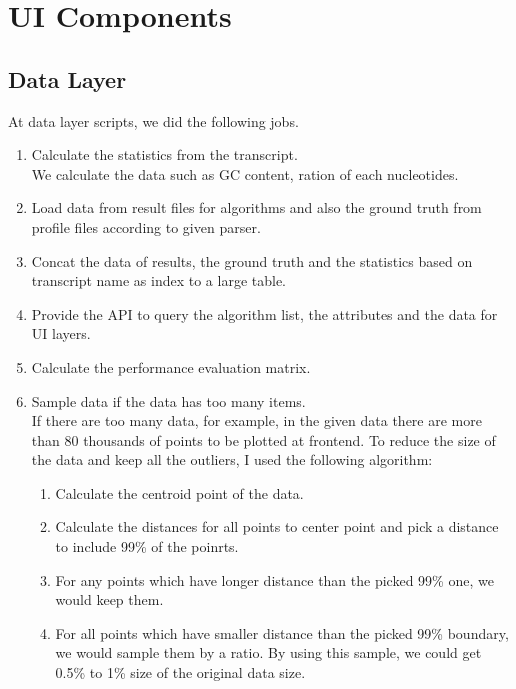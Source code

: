 \documentclass[11pt,letter]{article}
\begin{document}
\section {UI Components}

\subsection {Data Layer}
At data layer scripts, we did the following jobs.
\begin{enumerate}
\item Calculate the statistics from the transcript. \\
We calculate the data such as GC content, ration of each nucleotides.
\item Load data from result files for algorithms and also the ground truth from profile files according to given parser.
\item Concat the data of results, the ground truth and the statistics based on transcript name as index to a large table.
\item Provide the API to query the algorithm list, the attributes and the data for UI layers.
\item Calculate the performance evaluation matrix.
\item Sample data if the data has too many items. \\
If there are too many data, for example, in the given data there are more than 80 thousands of points to be plotted at frontend. To reduce the size of the data and keep all the outliers, I used the following algorithm:
\begin{enumerate}
\item Calculate the centroid point of the data.
\item Calculate the distances for all points to center point and pick a distance to include 99\% of the poinrts.
\item For any points which have longer distance than the picked 99\% one, we would keep them.
\item For all points which have smaller distance than the picked 99\% boundary, we would sample them by a ratio.
By using this sample, we could get 0.5\% to 1\% size of the original data size.
\end{enumerate}
\end{enumerate}
\end{document}
